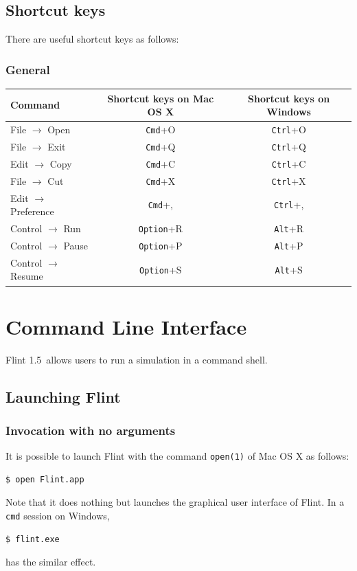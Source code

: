 \documentclass[a4paper,10pt]{report}
\def\FlintVersion{1.5}
\def\Flint{Flint \FlintVersion}
\begin{document}
\section{Shortcut keys}
There are useful shortcut keys as follows:

\subsection{General}
\begin{tabular}{l||c|c}
  Command & Shortcut keys on Mac OS X & Shortcut keys on Windows \\
  \hline
  File $\rightarrow$ Open & {\tt Cmd}+O & {\tt Ctrl}+O \\
  File $\rightarrow$ Exit & {\tt Cmd}+Q & {\tt Ctrl}+Q \\
  Edit $\rightarrow$ Copy & {\tt Cmd}+C & {\tt Ctrl}+C \\
  File $\rightarrow$ Cut  & {\tt Cmd}+X & {\tt Ctrl}+X \\
  Edit $\rightarrow$ Preference & {\tt Cmd}+, & {\tt Ctrl}+, \\
  Control $\rightarrow$ Run & {\tt Option}+R & {\tt Alt}+R \\
  Control $\rightarrow$ Pause & {\tt Option}+P & {\tt Alt}+P \\
  Control $\rightarrow$ Resume & {\tt Option}+S & {\tt Alt}+S \\
\end{tabular}


\chapter{Command Line Interface}
\Flint\ allows users to run a simulation in a command shell.

\section{Launching Flint}

\subsection{Invocation with no arguments}
It is possible to launch Flint with the command {\tt open(1)} of Mac OS X as follows:
\begin{verbatim}
$ open Flint.app
\end{verbatim}
Note that it does nothing but launches the graphical user interface of Flint.
In a {\tt cmd} session on Windows,
\begin{verbatim}
$ flint.exe
\end{verbatim}
has the similar effect.
\end{document}
